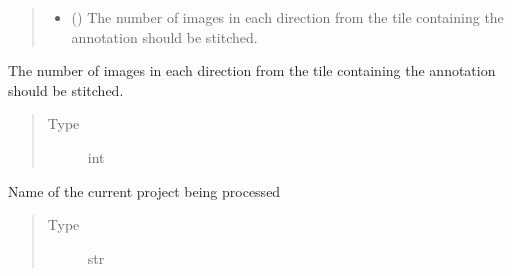 \documentclass[letterpaper,10pt,english]{sphinxmanual}
\begin{document}
\begin{fulllineitems}
\begin{quote}
\begin{description}
\begin{itemize}
\item {} 
 () \textendash{} The number of images in each direction from the tile containing the annotation should be
stitched.

\end{itemize}

\end{description}\end{quote}

\begin{fulllineitems}
\label{\detokenize{index:stitch_MAPS_annotations.Stitcher.stitch_radius}}
The number of images in each direction from the tile containing the annotation should be
stitched.
\begin{quote}\begin{description}
\item[{Type}] \leavevmode
int

\end{description}\end{quote}

\end{fulllineitems}


\begin{fulllineitems}
\label{\detokenize{index:stitch_MAPS_annotations.Stitcher.project_name}}
Name of the current project being processed
\begin{quote}\begin{description}
\item[{Type}] \leavevmode
str

\end{description}\end{quote}

\end{fulllineitems}



\end{fulllineitems}
\end{document}
